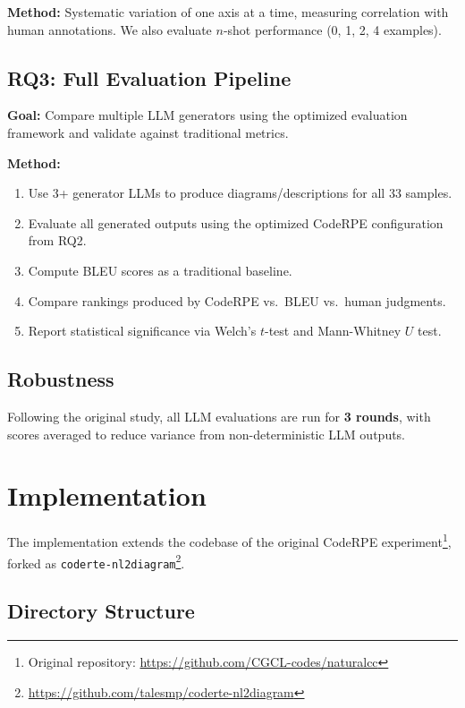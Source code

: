 \documentclass[lettersize,journal]{IEEEtran}
\begin{document}
\textbf{Method:} Systematic variation of one axis at a time, measuring correlation with human annotations. We also evaluate $n$-shot performance (0, 1, 2, 4 examples).

\subsection{RQ3: Full Evaluation Pipeline}

\textbf{Goal:} Compare multiple LLM generators using the optimized evaluation framework and validate against traditional metrics.

\textbf{Method:}
\begin{enumerate}
    \item Use 3+ generator LLMs to produce diagrams/descriptions for all 33 samples.
    \item Evaluate all generated outputs using the optimized CodeRPE configuration from RQ2.
    \item Compute BLEU scores as a traditional baseline.
    \item Compare rankings produced by CodeRPE vs.\ BLEU vs.\ human judgments.
    \item Report statistical significance via Welch's $t$-test and Mann-Whitney $U$ test.
\end{enumerate}

\subsection{Robustness}

Following the original study, all LLM evaluations are run for \textbf{3 rounds}, with scores averaged to reduce variance from non-deterministic LLM outputs.

\section{Implementation}
\label{sec:implementation}

The implementation extends the codebase of the original CodeRPE experiment\footnote{Original repository: \url{https://github.com/CGCL-codes/naturalcc}}, forked as \texttt{coderte-nl2diagram}\footnote{\url{https://github.com/talesmp/coderte-nl2diagram}}.

\subsection{Directory Structure}
\end{document}
